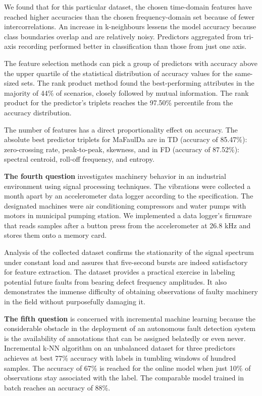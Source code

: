 We found that for this particular dataset, the chosen time-domain features have reached higher accuracies than the chosen frequency-domain set because of fewer intercorrelations. An increase in k-neighbours lessens the model accuracy because class boundaries overlap and are relatively noisy. Predictors aggregated from tri-axis recording performed better in classification than those from just one axis.

The feature selection methods can pick a group of predictors with accuracy above the upper quartile of the statistical distribution of accuracy values for the same-sized sets. The rank product method found the best-performing attributes in the majority of 44\% of scenarios, closely followed by mutual information. The rank product for the predictor's triplets reaches the 97.50\% percentile from the accuracy distribution.

The number of features has a direct proportionality effect on accuracy. The absolute best predictor triplets for MaFaulDa are in TD (accuracy of 85.47\%): zero-crossing rate, peak-to-peak, skewness, and in FD (accuracy of 87.52\%): spectral centroid, roll-off frequency, and entropy.

\textbf{The fourth question} investigates machinery behavior in an industrial environment using signal processing techniques. The vibrations were collected a month apart by an accelerometer data logger according to the specification. The designated machines were air conditioning compressors and water pumps with motors in municipal pumping station. We implemented a data logger's firmware that reads samples after a button press from the accelerometer at 26.8 kHz and stores them onto a memory card.

Analysis of the collected dataset confirms the stationarity of the signal spectrum under constant load and assures that five-second bursts are indeed satisfactory for feature extraction. The dataset provides a practical exercise in labeling potential future faults from bearing defect frequency amplitudes. It also demonstrates the immense difficulty of obtaining observations of faulty machinery in the field without purposefully damaging it.

\textbf{The fifth question} is concerned with incremental machine learning because the considerable obstacle in the deployment of an autonomous fault detection system is the availability of annotations that can be assigned belatedly or even never. Incremental k-NN algorithm on an unbalanced dataset for three predictors achieves at best 77\% accuracy with labels in tumbling windows of hundred samples. The accuracy of 67\% is reached for the online model when just 10\% of observations stay associated with the label. The comparable model trained in batch reaches an accuracy of 88\%.

